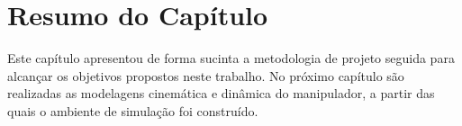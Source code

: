 \section{Resumo do Capítulo}
\label{metodo1b}

Este capítulo apresentou de forma sucinta a metodologia de projeto seguida para 
alcançar os objetivos propostos neste trabalho. No próximo capítulo são realizadas 
as modelagens cinemática e dinâmica do manipulador, a partir das quais o ambiente de 
simulação foi construído.


\clearpage